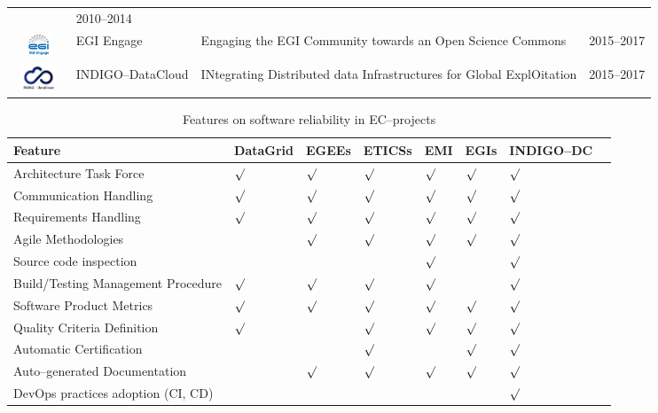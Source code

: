 \begin{table}[!h]
\begin{tabular}{p{1.6cm}p{2cm}p{5cm}l}
 & 2010--2014\\
\begin{minipage}{.3\textwidth}
\includegraphics[width=15mm,height=7.5mm]{images/egi_engage}
\end{minipage}
     & EGI Engage &
Engaging the EGI Community towards an Open Science Commons
 & 2015--2017\\
\begin{minipage}{.3\textwidth}
\includegraphics[width=15mm,height=7.5mm]{images/indigo}
\end{minipage}
     & INDIGO--DataCloud &
INtegrating Distributed data Infrastructures for Global ExplOitation
 & 2015--2017\\
\hline
\hline
\end{tabular}
\end{table}

\begin{table}[!h]
\renewcommand{\arraystretch}{1.3}
\caption{Features on software reliability in EC--projects}
\label{tab:feat}
\centering
\begin{tabular}{p{2.6cm}lllllll}
\hline
\hline
Feature & DataGrid & EGEEs & ETICSs & EMI & EGIs & INDIGO--DC\\
\hline
\hline
Architecture Task Force            &$\surd$&$\surd$&$\surd$&$\surd$&$\surd$&$\surd$\\
Communication Handling             &$\surd$&$\surd$&$\surd$&$\surd$&$\surd$&$\surd$\\
Requirements Handling              &$\surd$&$\surd$&$\surd$&$\surd$&$\surd$&$\surd$\\
Agile Methodologies                &       &$\surd$&$\surd$&$\surd$&$\surd$&$\surd$\\
Source code inspection             &       &       &       &$\surd$&       &$\surd$\\
Build/Testing Management Procedure &$\surd$&$\surd$&$\surd$&$\surd$&       &$\surd$\\
Software Product Metrics           &$\surd$&$\surd$&$\surd$&$\surd$&$\surd$&$\surd$\\
Quality Criteria Definition        &$\surd$&       &$\surd$&$\surd$&$\surd$&$\surd$\\
Automatic Certification            &       &       &$\surd$&       &$\surd$&$\surd$\\
Auto--generated Documentation      &       &$\surd$&$\surd$&$\surd$&$\surd$&$\surd$\\
DevOps practices adoption (CI, CD) &       &       &       &       &       &$\surd$\\
\hline
\hline
\end{tabular}
\end{table}

